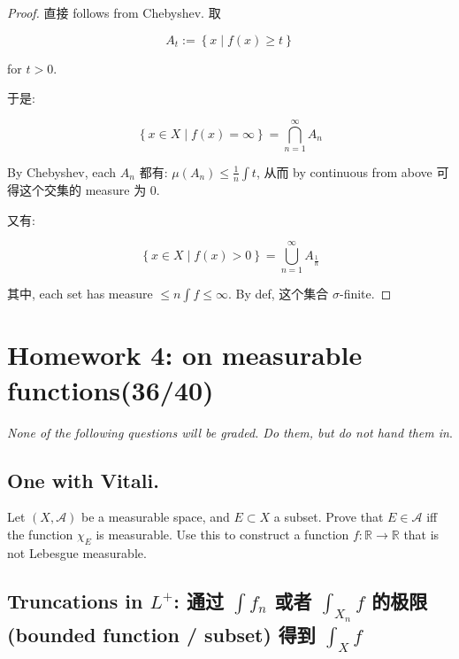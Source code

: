 \documentclass{qlnotes-export}
\begin{document}
\begin{proof}

直接 follows from Chebyshev. 取

\[A_{t} := \left\{ {x \mid f(x) \geq t} \right\}\]

for \(t > 0\).

于是:

\[\left\{ {x \in X \mid f(x) = \infty} \right\} = \bigcap\limits_{n = 1}^{\infty}A_{n}\]

By Chebyshev, each \(A_{n}\) 都有: \(\mu(A_{n}) \leq \frac{1}{n}\int t\), 从而 by continuous from above 可得这个交集的 measure 为 0.

又有:

\[\left\{ {x \in X \mid f(x) > 0} \right\} = \bigcup\limits_{n = 1}^{\infty}A_{\frac{1}{n}}\]

其中, each set has measure \(\leq n\int f \leq \infty\). By def, 这个集合 \(\sigma\)-finite.

\end{proof}

\chapter{Homework 4: on measurable functions(36/40)}\label{homework-4-on-measurable-functions3640}

\emph{None of the following questions will be graded. Do them, but do not hand them in}.

\section{One with Vitali.}

Let \((X,\mathcal{A})\) be a measurable space, and \(E \subset X\) a subset. Prove that \(E \in \mathcal{A}\) iff the function \(\chi_{E}\) is measurable. Use this to construct a function \(f:{\mathbb{R}}\rightarrow{\mathbb{R}}\) that is not Lebesgue measurable.

\section{\texorpdfstring{Truncations in \(L^{+}\): 通过 \(\int f_{n}\) 或者 \(\int_{X_{n}}f\) 的极限 (bounded function / subset) 得到 \(\int_{X}f\)}{Truncations in L\^{}\{+\}: 通过 \textbackslash int f\_\{n\} 或者 \textbackslash int\_\{X\_\{n\}\}f 的极限 (bounded function / subset) 得到 \textbackslash int\_\{X\}f}}\label{truncations-in-l-ux901aux8fc7-int-f_n-ux6216ux8005-int_x_n-f-ux7684ux6781ux9650-bounded-function-subset-ux5f97ux5230-int_x-f}
\end{document}
